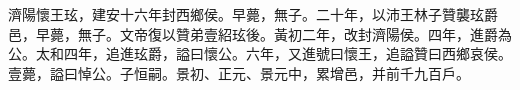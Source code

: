 \begin{pinyinscope}
 
 
 濟陽懷王玹，建安十六年封西鄉侯。早薨，無子。二十年，以沛王林子贊襲玹爵邑，早薨，無子。文帝復以贊弟壹紹玹後。黃初二年，改封濟陽侯。四年，進爵為公。太和四年，追進玹爵，謚曰懷公。六年，又進號曰懷王，追謚贊曰西鄉哀侯。壹薨，謚曰悼公。子恒嗣。景初、正元、景元中，累增邑，并前千九百戶。
 
 
\end{pinyinscope}
